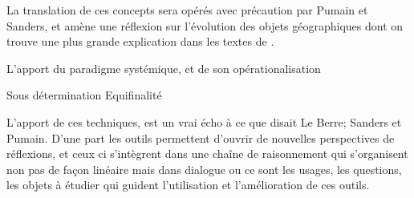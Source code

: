 

La translation de ces concepts sera opérés avec précaution par Pumain et Sanders, et amène une réflexion sur l'évolution des objets géographiques dont on trouve une plus grande explication dans les textes de \textcite{Pumain1982b, Pumain1989}.


L'apport du paradigme systémique, et de son opérationalisation 

Sous détermination
Equifinalité





L'apport de ces techniques, est un vrai écho à ce que disait Le Berre; Sanders et Pumain. D'une part les outils permettent d'ouvrir de nouvelles perspectives de réflexions, et ceux ci s’intègrent dans une chaîne de raisonnement qui s'organisent non pas de façon linéaire mais dans dialogue ou ce sont les usages, les questions, les objets à étudier qui guident l'utilisation et l'amélioration de ces outils.


